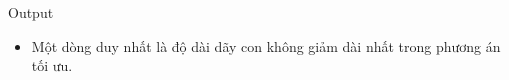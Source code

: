 Output  
\begin{itemize}
	\item     Một dòng duy nhất là độ dài dãy con không giảm dài nhất trong phương án tối ưu.   
\end{itemize}